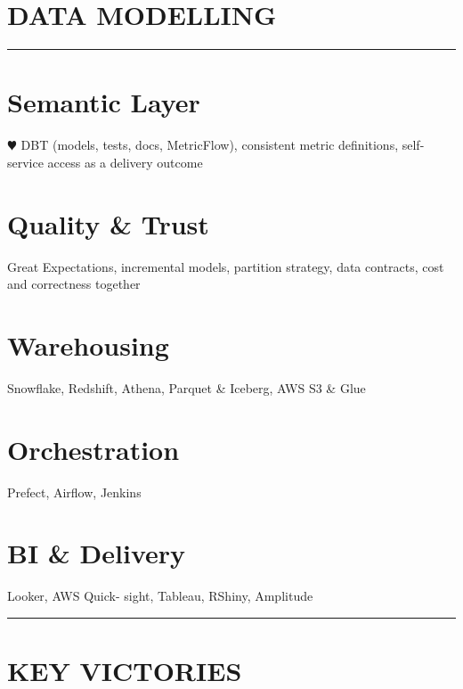 %

\section{DATA MODELLING}
\vspace{-0.1cm}%
\noindent\rule{\textwidth}{0.4pt}
\vspace{-0.1cm}%
%
\section{\large Semantic Layer}
{\color{red} $\varheartsuit$} DBT (models, tests, docs, MetricFlow), consistent metric definitions, self-service access as a delivery outcome
%
\section{\large Quality \& Trust}
Great Expectations, incremental models, partition strategy, data contracts, cost and correctness together
%
\section{\large Warehousing}
Snowflake, Redshift, Athena, Parquet \& Iceberg, AWS S3 \& Glue
%
\section{\large Orchestration}
{\color{purple} } Prefect, Airflow, Jenkins
%
\section{\large BI \& Delivery}
Looker, AWS Quick- sight, Tableau, RShiny, Amplitude
%
\noindent\rule{\textwidth}{0.4pt}%
\vspace{-0.1cm}%
%
\section{KEY VICTORIES}
\vspace{-0.25cm}
%
%
